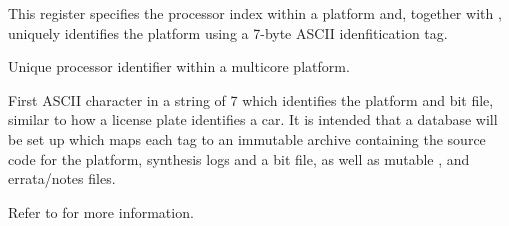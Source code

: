 

This register specifies the processor index within a platform and, together with
, uniquely identifies the platform using a 7-byte ASCII
idenfitication tag.

\reset{********}
Unique processor identifier within a multicore platform.

First ASCII character in a string of 7 which identifies the platform and bit
file, similar to how a license plate identifies a car. It is intended that a
database will be set up which maps each tag to an immutable archive containing
the source code for the platform, synthesis logs and a bit file, as well as
mutable ,  and errata/notes files.



Refer to  for more information.


